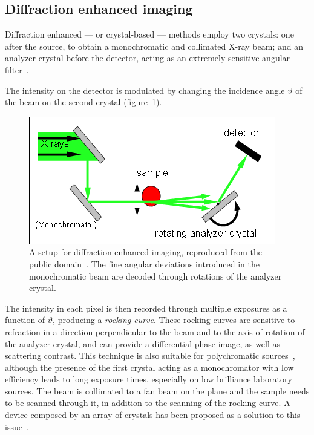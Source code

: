 \subsection{Diffraction enhanced imaging}
Diffraction enhanced --- or crystal-based --- methods employ two crystals:
one after the source, to obtain a monochromatic and collimated X-ray beam;
and an analyzer crystal before the detector, acting as an extremely
sensitive angular filter~\parencite{pmid10751500}.

The intensity on the detector is modulated by changing the incidence angle
$\vartheta$ of the beam on the second crystal (figure~\ref{fig:dei}).
\begin{figure}[htb]
    \centering
    \includegraphics[width=.7\textwidth]{gfx/analyzer-based_imaging.png}
    \caption[Analyzer-based setup.]{A setup for diffraction enhanced
        imaging, reproduced from the public domain~\parencite{analyzer-based-picture}. The fine angular deviations introduced in the
    monochromatic beam are decoded through rotations of the analyzer crystal.}
    \label{fig:dei}
\end{figure}
The intensity in each pixel is then recorded through multiple exposures as a
function of $\vartheta$, producing a \emph{rocking curve}. These rocking
curves are sensitive to refraction in a direction perpendicular to the beam
and to the axis of rotation of the analyzer crystal, and can provide a
differential phase image, as well as scattering contrast. This technique
is also suitable for polychromatic sources~\parencite{doi:10.1117/12.813669,PARHAM2009911}, although the presence of the
first crystal acting as a monochromator with low efficiency leads to
long exposure times, especially on low brilliance laboratory sources. The
beam is collimated to a fan beam on the plane and the sample needs to
be scanned through it, in addition to the scanning of the rocking curve. A
device composed by an array of crystals has been proposed as a solution to
this issue~\parencite{Connor2014}.

